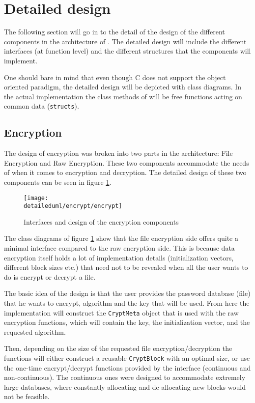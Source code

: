 \section{Detailed design}

The following section will go in to the detail of the design of the different
components in the architecture of \pman. The detailed design will include the
different interfaces (at function level) and the different structures that the
components will implement.

One should bare in mind that even though C does not support the object oriented
paradigm, the detailed design will be depicted with class diagrams. In the
actual implementation the class methods of will be free functions acting on
common data (\texttt{structs}).

\subsection{Encryption}

The design of encryption was broken into two parts in the architecture:
File Encryption and Raw Encryption. These two components accommodate the needs
of \pman when it comes to encryption and decryption. The detailed design of
these two components can be seen in figure \ref{dia:encrypt_design}.

\begin{figure}[H]
    \centering
    \centerline{\texttt{[image: \\detaileduml/encrypt/encrypt]}}
    \caption{Interfaces and design of the encryption components}
    \label{dia:encrypt_design}
\end{figure}

The class diagrams of figure \ref{dia:encrypt_design} show that the file
encryption side offers quite a minimal interface compared to the raw encryption
side. This is because data encryption itself holds a lot of implementation
details (initialization vectors, different block sizes etc.) that need not to
be revealed when all the user wants to do is encrypt or decrypt a file.

The basic idea of the design is that the user provides the password database
(file) that he wants to encrypt, algorithm and the key that will be used. From
here the implementation will construct the \texttt{CryptMeta} object that is
used with the raw encryption functions, which will contain the key, the
initialization vector, and the requested algorithm.

Then, depending on the size of the requested file encryption/decryption
the functions will either construct a reusable \texttt{CryptBlock} with an
optimal size, or use the one-time encrypt/decrypt functions provided by the
interface (continuous and non-continuous). The continuous ones were designed
to accommodate extremely large databases, where constantly allocating and
de-allocating new blocks would not be feasible.

